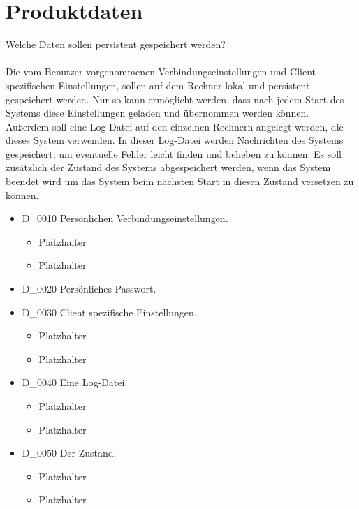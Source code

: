 \chapter{Produktdaten}
Welche Daten sollen persistent gespeichert werden?\ \\ \\
Die vom Benutzer vorgenommenen Verbindungseinstellungen und Client spezifischen Einstellungen,
sollen auf dem Rechner lokal und persistent gespeichert werden. Nur so kann ermöglicht werden,
dass nach jedem Start des Systems diese Einstellungen geladen und übernommen werden können.\ \\
Außerdem soll eine Log-Datei auf den einzelnen Rechnern angelegt werden, die dieses System
verwenden. In dieser Log-Datei werden Nachrichten des Systems gespeichert, um eventuelle Fehler
leicht finden und beheben zu können. Es soll zusätzlich der Zustand des Systems abgespeichert werden,
wenn das System beendet wird um das System beim nächsten Start in diesen Zustand versetzen zu können.
\renewcommand{\labelitemi}{•}
\begin{itemize}
	\item D\_0010 Persönlichen Verbindungseinstellungen.
	\begin{itemize}
		\item Platzhalter
		\item Platzhalter
	\end{itemize}
	\item D\_0020 Persönliches Passwort.
	\item D\_0030 Client spezifische Einstellungen.
	\begin{itemize}
		\item Platzhalter
		\item Platzhalter
	\end{itemize}
	\item D\_0040 Eine Log-Datei.
	\begin{itemize}
		\item Platzhalter
		\item Platzhalter
	\end{itemize}
	\item D\_0050 Der Zustand.
	\begin{itemize}
		\item Platzhalter
		\item Platzhalter
	\end{itemize}
\end{itemize}
